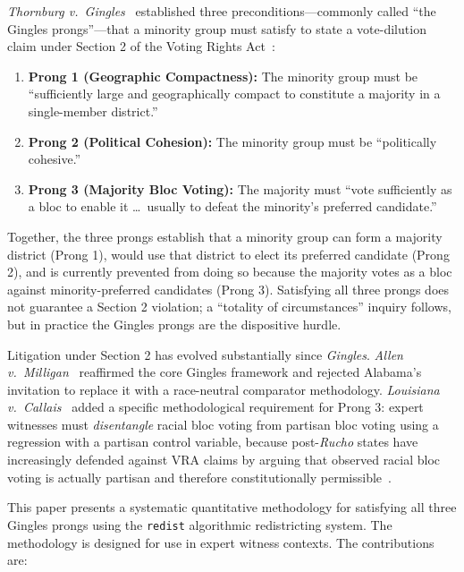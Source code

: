 \label{sec:introduction}

\textit{Thornburg v.\ Gingles}~\citep{gingles1986} established three
preconditions---commonly called ``the Gingles prongs''---that a minority
group must satisfy to state a vote-dilution claim under Section 2 of the
Voting Rights Act~\citep{vra1965}:

\begin{enumerate}
  \item \textbf{Prong 1 (Geographic Compactness):} The minority group must be
    ``sufficiently large and geographically compact to constitute a majority
    in a single-member district.''
  \item \textbf{Prong 2 (Political Cohesion):} The minority group must be
    ``politically cohesive.''
  \item \textbf{Prong 3 (Majority Bloc Voting):} The majority must ``vote
    sufficiently as a bloc to enable it \ldots\ usually to defeat the
    minority's preferred candidate.''
\end{enumerate}

Together, the three prongs establish that a minority group can form a
majority district (Prong 1), would use that district to elect its preferred
candidate (Prong 2), and is currently prevented from doing so because the
majority votes as a bloc against minority-preferred candidates (Prong 3).
Satisfying all three prongs does not guarantee a Section 2 violation; a
``totality of circumstances'' inquiry follows, but in practice the Gingles
prongs are the dispositive hurdle.

Litigation under Section 2 has evolved substantially since \textit{Gingles}.
\textit{Allen v.\ Milligan}~\citep{allen2023} reaffirmed the core Gingles
framework and rejected Alabama's invitation to replace it with a race-neutral
comparator methodology.  \textit{Louisiana v.\ Callais}~\citep{callais2026}
added a specific methodological requirement for Prong 3: expert witnesses must
\emph{disentangle} racial bloc voting from partisan bloc voting using a
regression with a partisan control variable, because post-\textit{Rucho}
states have increasingly defended against VRA claims by arguing that observed
racial bloc voting is actually partisan and therefore constitutionally
permissible~\citep{rucho2019}.

This paper presents a systematic quantitative methodology for satisfying all
three Gingles prongs using the \texttt{redist} algorithmic redistricting
system.  The methodology is designed for use in expert witness contexts.
The contributions are:

